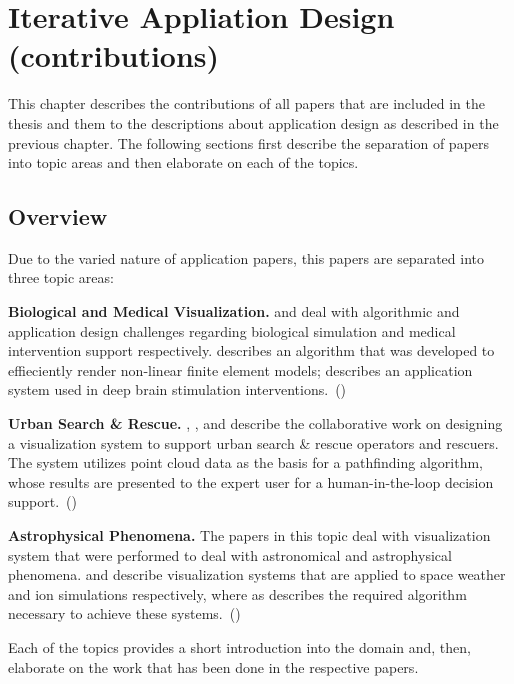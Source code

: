 \chapter{Iterative Appliation Design (contributions)}
\label{cha:contributions}

This chapter describes the contributions of all papers that are included in the thesis and them to the descriptions about application design as described in the previous chapter. The following sections first describe the separation of papers into topic areas and then elaborate on each of the topics.

\section{Overview}
\label{contributions:overview}
Due to the varied nature of application papers, this papers are separated into three topic areas:

\textbf{Biological and Medical Visualization. }  and  deal with algorithmic and application design challenges regarding biological simulation and medical intervention support respectively.  describes an algorithm that was developed to effieciently render non-linear finite element models;  describes an application system used in deep brain stimulation interventions.~()

\textbf{Urban Search \& Rescue. } , , and  describe the collaborative work on designing a visualization system to support urban search \& rescue operators and rescuers. The system utilizes  point cloud data as the basis for a pathfinding algorithm, whose results are presented to the expert user for a human-in-the-loop decision support.~()

\textbf{Astrophysical Phenomena. } The papers in this topic deal with visualization system that were performed to deal with astronomical and astrophysical phenomena.  and  describe visualization systems that are applied to space weather and ion simulations respectively, where as  describes the required algorithm necessary to achieve these systems.~()

Each of the topics provides a short introduction into the domain and, then, elaborate on the work that has been done in the respective papers.


